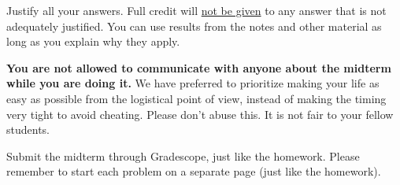 \documentclass[11pt,twoside]{article}
\newif\ifproblem\newif\ifsolution\problemtrue
\begin{document}
\examheader

\ifproblem
\begin{center}
\vspace{-26pt} %
\advance\textwidth -1.6in
\medskip
\end{center}
\fi

Justify all your answers. Full credit will \underline{not be given} to any answer that is not adequately justified. You can use results from the notes and other material as long as you explain why they apply.

\textbf{You are not allowed to communicate with anyone about the midterm while you are doing it.} We have preferred to prioritize making your life as easy as possible from the logistical point of view, instead of making the timing very tight to avoid cheating. Please don't abuse this. It is not fair to your fellow students.

Submit the midterm through Gradescope, just like the homework. Please remember to start each problem on a separate page (just like the homework).
\end{document}
